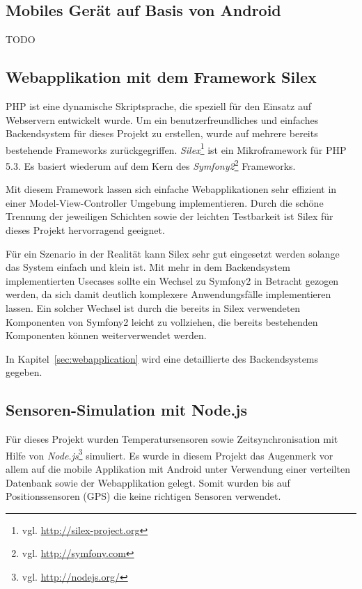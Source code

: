 \subsection{Mobiles Gerät auf Basis von Android}

TODO

\subsection{Webapplikation mit dem Framework Silex}
\label{subsec:webapplication}

PHP ist eine dynamische Skriptsprache, die speziell für den Einsatz auf Webservern
	entwickelt wurde. Um ein benutzerfreundliches und einfaches Backendsystem
	für dieses Projekt zu erstellen, wurde auf mehrere bereits bestehende Frameworks
	zurückgegriffen. \emph{Silex}\footnote{vgl. \url{http://silex-project.org}} ist
	ein	Mikroframework für PHP 5.3. Es basiert wiederum auf dem Kern des
	\emph{Symfony2}\footnote{vgl. \url{http://symfony.com}} Frameworks.
	
Mit diesem Framework lassen sich einfache Webapplikationen sehr effizient in einer
	Model-View-Controller Umgebung implementieren. Durch die schöne Trennung der
	jeweiligen Schichten sowie der leichten Testbarkeit ist Silex für dieses
	Projekt hervorragend geeignet.
	
Für ein Szenario in der Realität kann Silex sehr gut eingesetzt werden solange das
	System einfach und klein ist. Mit mehr in dem Backendsystem implementierten
	Usecases sollte ein Wechsel zu Symfony2 in Betracht gezogen werden, da sich
	damit deutlich komplexere Anwendungsfälle implementieren lassen. Ein solcher
	Wechsel ist durch die bereits in Silex verwendeten Komponenten von Symfony2
	leicht zu vollziehen, die bereits bestehenden Komponenten können
	weiterverwendet werden.
	
In Kapitel~\ref{sec:webapplication} wird eine detaillierte des Backendsystems
	gegeben.

\subsection{Sensoren-Simulation mit Node.js}
\label{subsec:nodejs}

Für dieses Projekt wurden Temperatursensoren sowie Zeitsynchronisation mit
	Hilfe von \emph{Node.js}\footnote{vgl. \url{http://nodejs.org/}} simuliert.
	Es wurde in diesem Projekt das Augenmerk vor allem auf die mobile Applikation
	mit Android unter Verwendung einer verteilten Datenbank sowie der
	Webapplikation gelegt. Somit wurden	bis auf	Positionssensoren (GPS) die
	keine richtigen Sensoren verwendet.

